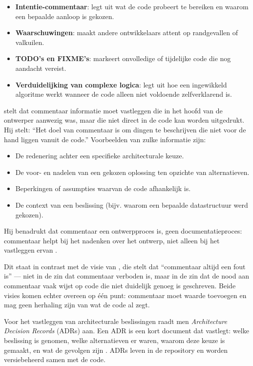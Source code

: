 \begin{itemize}
    \item \textbf{Intentie-commentaar}: legt uit wat de code probeert te bereiken en waarom een bepaalde aanloop is gekozen.
    \item \textbf{Waarschuwingen}: maakt andere ontwikkelaars attent op randgevallen of valkuilen.
    \item \textbf{TODO's en FIXME's}: markeert onvolledige of tijdelijke code die nog aandacht vereist.
    \item \textbf{Verduidelijking van complexe logica}: legt uit hoe een ingewikkeld algoritme werkt wanneer de code alleen niet voldoende zelfverklarend is.
\end{itemize}

\textcite{ousterhout2018philosophy} stelt dat commentaar informatie moet vastleggen die in het hoofd van de ontwerper aanwezig was, maar die niet direct in de code kan worden uitgedrukt. Hij stelt: ``Het doel van commentaar is om dingen te beschrijven die niet voor de hand liggen vanuit de code.'' Voorbeelden van zulke informatie zijn:

\begin{itemize}
    \item De redenering achter een specifieke architecturale keuze.
    \item De voor- en nadelen van een gekozen oplossing ten opzichte van alternatieven.
    \item Beperkingen of assumpties waarvan de code afhankelijk is.
    \item De context van een beslissing (bijv. waarom een bepaalde datastructuur werd gekozen).
\end{itemize}

Hij benadrukt dat commentaar een ontwerpproces is, geen documentatieproces: commentaar helpt bij het nadenken over het ontwerp, niet alleen bij het vastleggen ervan \autocite{ousterhout2018philosophy}.

Dit staat in contrast met de visie van \textcite{martin2008clean}, die stelt dat ``commentaar altijd een fout is'' --- niet in de zin dat commentaar verboden is, maar in de zin dat de nood aan commentaar vaak wijst op code die niet duidelijk genoeg is geschreven. Beide visies komen echter overeen op één punt: commentaar moet waarde toevoegen en mag geen herhaling zijn van wat de code al zegt.

Voor het vastleggen van architecturale beslissingen raadt men \textit{Architecture Decision Records} (ADRs) aan. Een ADR is een kort document dat vastlegt: welke beslissing is genomen, welke alternatieven er waren, waarom deze keuze is gemaakt, en wat de gevolgen zijn \autocite{martraire2019livingdocumentation}. ADRs leven in de repository en worden versiebeheerd samen met de code.

